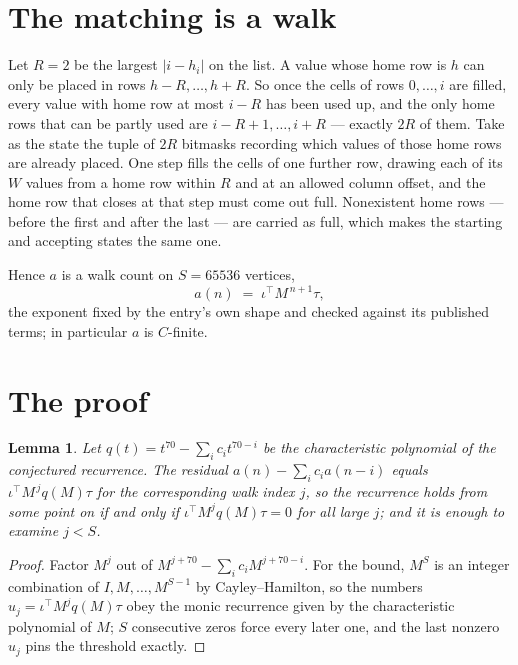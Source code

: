 \documentclass[11pt,a4paper]{article}
\theoremstyle{plain}
\newtheorem{lemma}[theorem]{Lemma}
\theoremstyle{definition}
\begin{document}
\section{The matching is a walk}

Let $R=2$ be the largest $|i-h_i|$ on the list. A value whose home row is $h$ can only be
placed in rows $h-R,\dots,h+R$. So once the cells of rows $0,\dots,i$ are filled, every
value with home row at most $i-R$ has been used up, and the only home rows that can be
partly used are $i-R+1,\dots,i+R$ --- exactly $2R$ of them. Take as the state the tuple of
$2R$ bitmasks recording which values of those home rows are already placed. One step fills
the cells of one further row, drawing each of its $W$ values from a home row within $R$
and at an allowed column offset, and the home row that closes at that step must come out
full. Nonexistent home rows --- before the first and after the last --- are carried as
full, which makes the starting and accepting states the same one.

Hence $a$ is a walk count on $S=65536$ vertices,
\[
a(n)\;=\;\iota^{\!\top}M^{\,n+1}\tau ,
\]
the exponent fixed by the entry's own shape and checked against its published terms; in
particular $a$ is $C$-finite.

\section{The proof}

\begin{lemma}\label{lem:crit}
Let $q(t)=t^{70}-\sum_i c_it^{70-i}$ be the characteristic polynomial of the
conjectured recurrence. The residual $a(n)-\sum_ic_ia(n-i)$ equals
$\iota^{\!\top}M^{\,j}q(M)\tau$ for the corresponding walk index $j$, so the recurrence
holds from some point on if and only if $\iota^{\!\top}M^{j}q(M)\tau=0$ for all large $j$;
and it is enough to examine $j<S$.
\end{lemma}

\begin{proof}
Factor $M^{j}$ out of $M^{j+70}-\sum_ic_iM^{j+70-i}$. For the bound, $M^{S}$
is an integer combination of $I,M,\dots,M^{S-1}$ by Cayley--Hamilton, so the numbers
$u_j=\iota^{\!\top}M^{j}q(M)\tau$ obey the monic recurrence given by the characteristic
polynomial of $M$; $S$ consecutive zeros force every later one, and the last nonzero $u_j$
pins the threshold exactly.
\end{proof}
\end{document}
